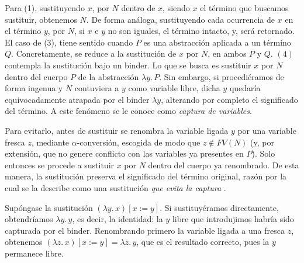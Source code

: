 Para (1), sustituyendo $x$, por $N$ dentro de $x$, siendo $x$ el término que buscamos sustituir, obtenemos $N$. De forma análoga, sustituyendo cada ocurrencia de $x$ en el término $y$, por $N$, si $x$ e $y$ no son iguales, el término intacto, y, será retornado. El caso de (3), tiene sentido cuando $P$ es una abstracción aplicada a un término $Q$. Concretamente, se reduce a la sustitución de $x$ por $N$, en ambos $P$ y $Q$. $(4)$ contempla la sustitución bajo un binder. Lo que se busca es
sustituir $x$ por $N$ dentro del cuerpo $P$ de la abstracción $\lambda y.\, P$. Sin embargo,
si procediéramos de forma ingenua y $N$ contuviera a $y$ como variable libre, dicha $y$
quedaría equivocadamente atrapada por el binder $\lambda y$, alterando por completo el
significado del término. A este fenómeno se le conoce como \textit{captura de variables}.

Para evitarlo, antes de sustituir se renombra la variable ligada $y$ por una variable fresca
$z$, mediante $\alpha$-conversi\'on, escogida de modo que $z \notin FV(N)$ (y, por extensi\'on,
que no genere conflicto con las variables ya presentes en $P$). Solo entonces se procede a
sustituir $x$ por $N$ dentro del cuerpo ya renombrado. De esta manera, la sustituci\'on
preserva el significado del t\'ermino original, raz\'on por la cual se la describe como una
sustituci\'on \textit{que evita la captura} \citep{pierce2002}.

\begin{example}
  Sup\'ongase la sustituci\'on $(\lambda y.\, x)[x := y]$. Si sustituy\'eramos directamente,
  obtendr\'iamos $\lambda y.\, y$, es decir, la identidad: la $y$ libre que introdujimos
  habr\'ia sido capturada por el binder. Renombrando primero la variable ligada a una
  fresca $z$, obtenemos $(\lambda z.\, x)[x := y] = \lambda z.\, y$, que es el resultado
  correcto, pues la $y$ permanece libre.
\end{example}


